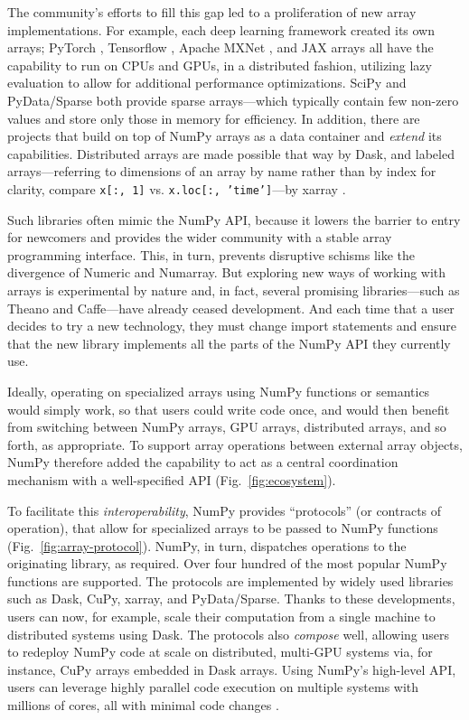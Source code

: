 \documentclass[twocolumn]{article}
\begin{document}
The community's efforts to fill this gap led to a
proliferation of new array implementations. For example, each deep learning framework created
its own arrays; PyTorch \cite{NEURIPS2019_9015},
Tensorflow \cite{abadi2016tensorflow}, Apache MXNet \cite{chen2015mxnet},
and JAX arrays all have the
capability to run on CPUs and GPUs, in a distributed fashion, utilizing lazy evaluation
to allow for additional performance optimizations.  SciPy and PyData/Sparse both
provide sparse arrays---which typically contain few non-zero values and store
only those in memory for efficiency.
In addition, there are projects that build on top of NumPy arrays as a data
container and \textit{extend} its capabilities.  Distributed arrays are
made possible that way by Dask, and labeled arrays---referring to dimensions of
an array by name rather than by index for clarity, compare \texttt{x[:,~1]} vs.
\texttt{x.loc[:,~'time']}---by xarray \cite{hoyer2017xarray}.

Such libraries often mimic the NumPy API, because it lowers the
barrier to entry for newcomers and provides the wider community with a
stable array programming interface. This, in turn, prevents disruptive
schisms like the divergence of Numeric and Numarray.
But exploring new ways of working with arrays is experimental by nature
and, in fact, several promising libraries---such as Theano and Caffe---have
already ceased development. And each time that a user
decides to try a new technology, they must
change import statements and ensure that the new library implements
all the parts of the NumPy API they currently use.

Ideally, operating on specialized arrays using NumPy functions or semantics would
simply work, so that users could write code once, and would then benefit
from switching between NumPy arrays, GPU arrays, distributed arrays,
and so forth, as appropriate.
To support array operations between external array objects, NumPy
therefore added the capability to act as a central coordination
mechanism with a well-specified API (Fig.~\ref{fig:ecosystem}).

To facilitate this \emph{interoperability}, NumPy provides
``protocols'' (or contracts of operation), that allow for specialized arrays to be
passed to NumPy functions (Fig.~\ref{fig:array-protocol}).
NumPy, in turn, dispatches operations to the originating library, as required.
Over four hundred of the most popular
NumPy functions are supported.
The protocols are implemented by widely used libraries such as Dask, CuPy,
xarray, and PyData/Sparse.
Thanks to these developments, users can now, for example, scale
their computation from a single machine to distributed systems using Dask.
The protocols also \textit{compose} well, allowing users to redeploy NumPy
code at scale on distributed, multi-GPU systems via, for instance, CuPy arrays embedded in Dask
arrays. Using NumPy's high-level API, users can leverage highly parallel code
execution on multiple systems with millions of cores, all with minimal code
changes \cite{entschev2019}.
\end{document}

